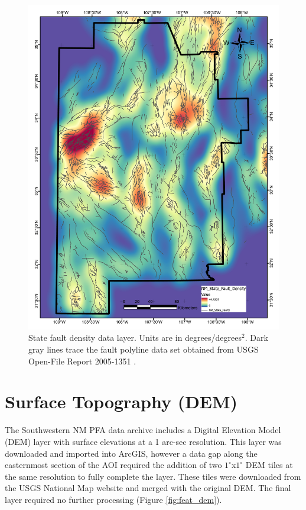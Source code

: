 \begin{figure}[H]
\centering
\includegraphics[width=0.75\linewidth]{templates/images/Figure-StateFaultDensity.pdf}
\caption[State fault density data layer]{State fault density data layer. Units are in degrees/degrees$^2$. Dark gray lines trace the fault polyline data set obtained from USGS Open-File Report 2005-1351 \protect\citep{stoeser_usgs_2005}.}
\label{fig:state_faults}
\end{figure}
\pagebreak

\section{Surface Topography (DEM)}\label{app:dl_dem}
The Southwestern NM PFA data archive \citep{kelley_geothermal_2015} includes a Digital Elevation Model (DEM) layer with surface elevations at a 1 arc-sec resolution. This layer was downloaded and imported into ArcGIS, however a data gap along the easternmost section of the AOI required the addition of two $1^\circ$x$1^\circ$ DEM tiles at the same resolution to fully complete the layer. These tiles were downloaded from the USGS National Map website \citep{usgs_tnm_2021} and merged with the original DEM. The final layer required no further processing (Figure \ref{fig:feat_dem}).
\vfill
\pagebreak

